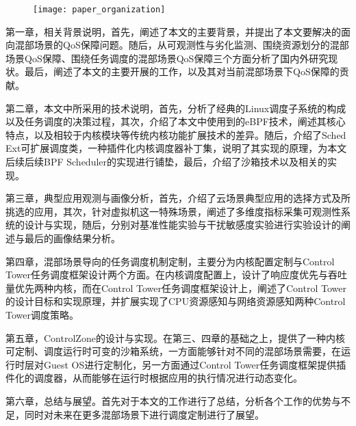 \begin{figure}[!htbp]
    \centering
    \texttt{[image: paper\_organization]}
    \label{fig:paper_organization}
\end{figure}

第一章，相关背景说明，首先，阐述了本文的主要背景，并提出了本文要解决的面向混部场景的QoS保障问题。随后，从可观测性与劣化监测、围绕资源划分的混部场景QoS保障、围绕任务调度的混部场景QoS保障三个方面分析了国内外研究现状。最后，阐述了本文的主要开展的工作，以及其对当前混部场景下QoS保障的贡献。

第二章，本文中所采用的技术说明，首先，分析了经典的Linux调度子系统的构成以及任务调度的决策过程，其次，介绍了本文中使用到的eBPF技术，阐述其核心特点，以及相较于内核模块等传统内核功能扩展技术的差异。随后，介绍了Sched Ext可扩展调度类，一种插件化内核调度器补丁集，说明了其实现的原理，为本文后续后续BPF Scheduler的实现进行铺垫，最后，介绍了沙箱技术以及相关的实现。

第三章，典型应用观测与画像分析，首先，介绍了云场景典型应用的选择方式及所挑选的应用，其次，针对虚拟机这一特殊场景，阐述了多维度指标采集可观测性系统的设计与实现，随后，分别对基准性能实验与干扰敏感度实验进行实验设计的阐述与最后的画像结果分析。

第四章，混部场景导向的任务调度机制定制，主要分为内核配置定制与Control Tower任务调度框架设计两个方面。在内核调度配置上，设计了响应度优先与吞吐量优先两种内核，而在Control Tower任务调度框架设计上，阐述了Control Tower的设计目标和实现原理，并扩展实现了CPU资源感知与网络资源感知两种Control Tower调度策略。

第五章，ControlZone的设计与实现。在第三、四章的基础之上，提供了一种内核可定制、调度运行时可变的沙箱系统，一方面能够针对不同的混部场景需要，在运行时层对Guest OS进行定制化，另一方面通过Control Tower任务调度框架提供插件化的调度器，从而能够在运行时根据应用的执行情况进行动态变化。

第六章，总结与展望。首先对于本文的工作进行了总结，分析各个工作的优势与不足，同时对未来在更多混部场景下进行调度定制进行了展望。